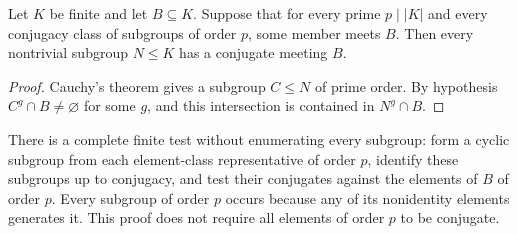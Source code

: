 \documentclass[11pt,a4paper]{article}
\begin{document}
\begin{lemma}\label{prime}
Let $K$ be finite and let $B\subseteq K$. Suppose that for every prime $p\mid |K|$ and every conjugacy class of subgroups of order $p$, some member meets $B$. Then every nontrivial subgroup $N\leq K$ has a conjugate meeting $B$.
\end{lemma}
\begin{proof}
Cauchy's theorem gives a subgroup $C\leq N$ of prime order. By hypothesis $C^g\cap B\ne\varnothing$ for some $g$, and this intersection is contained in $N^g\cap B$.
\end{proof}
There is a complete finite test without enumerating every subgroup: form a cyclic subgroup from each element-class representative of order $p$, identify these subgroups up to conjugacy, and test their conjugates against the elements of $B$ of order $p$. Every subgroup of order $p$ occurs because any of its nonidentity elements generates it. This proof does not require all elements of order $p$ to be conjugate.
\end{document}

